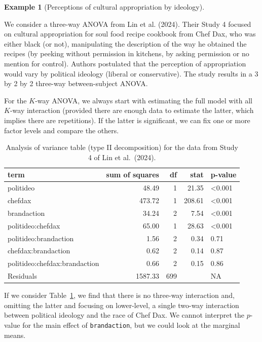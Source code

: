 \documentclass[
  11pt,
  letterpaper,
]{scrbook}
\theoremstyle{definition}
\newtheorem{example}{Example}[chapter]
\theoremstyle{definition}
\theoremstyle{remark}
\begin{document}
\begin{example}[Perceptions of cultural appropriation by
ideology]\protect\hypertarget{exm-LKUK24}{}\label{exm-LKUK24}

We consider a three-way ANOVA from Lin et al. (2024). Their Study 4
focused on cultural appropriation for soul food recipe cookbook from
Chef Dax, who was either black (or not), manipulating the description of
the way he obtained the recipes (by peeking without permission in
kitchens, by asking permission or no mention for control). Authors
postulated that the perception of appropriation would vary by political
ideology (liberal or conservative). The study results in a 3 by 2 by 2
three-way between-subject ANOVA.

For the \(K\)-way ANOVA, we always start with estimating the full model
with all \(K\)-way interaction (provided there are enough data to
estimate the latter, which implies there are repetitions). If the latter
is significant, we can fix one or more factor levels and compare the
others.

\begin{longtable}[]{@{}lrrrl@{}}

\caption{\label{tbl-anova-LKUK24}Analysis of variance table (type II
decomposition) for the data from Study 4 of Lin et al.~(2024).}

\tabularnewline

\toprule\noalign{}
term & sum of squares & df & stat & p-value \\
\midrule\noalign{}
\endhead
\bottomrule\noalign{}
\endlastfoot
politideo & 48.49 & 1 & 21.35 & \textless0.001 \\
chefdax & 473.72 & 1 & 208.61 & \textless0.001 \\
brandaction & 34.24 & 2 & 7.54 & \textless0.001 \\
politideo:chefdax & 65.00 & 1 & 28.63 & \textless0.001 \\
politideo:brandaction & 1.56 & 2 & 0.34 & 0.71 \\
chefdax:brandaction & 0.62 & 2 & 0.14 & 0.87 \\
politideo:chefdax:brandaction & 0.66 & 2 & 0.15 & 0.86 \\
Residuals & 1587.33 & 699 & & NA \\

\end{longtable}

If we consider Table~\ref{tbl-anova-LKUK24}, we find that there is no
three-way interaction and, omitting the latter and focusing on
lower-level, a single two-way interaction between political ideology and
the race of Chef Dax. We cannot interpret the \(p\)-value for the main
effect of \texttt{brandaction}, but we could look at the marginal means.


\end{example}
\end{document}
